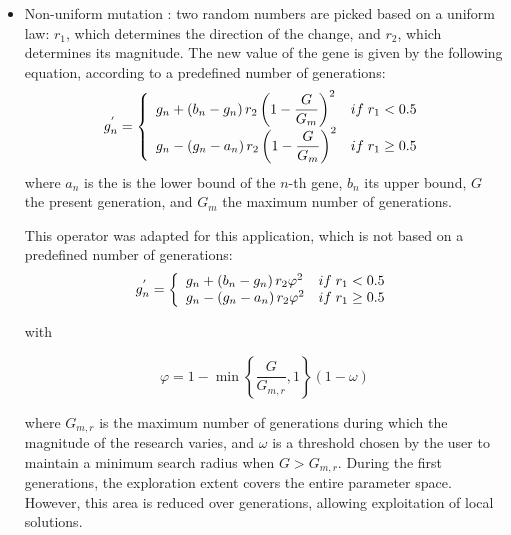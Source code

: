 \documentclass{ametsoc}
\begin{document}
\begin{itemize}
	\item Non-uniform mutation \citep{Michalewicz1996}: two random numbers are picked based on a uniform law: $r_{1}$, which determines the direction of the change, and $r_{2}$, which determines its magnitude. The new value of the gene is given by the following equation, according to a predefined number of generations:
	\begin{equation}
	g_{n}^{'} = 
	\left\lbrace \begin{array}{l l} 
	g_{n} + \left(b_{n}-g_{n}\right) r_{2} \left(1 - \dfrac{G}{G_{m}} \right)^{2} & if \; r_{1} < 0.5 \\
	g_{n} - \left(g_{n}-a_{n}\right) r_{2} \left(1 - \dfrac{G}{G_{m}} \right)^{2} & if \; r_{1} \geq 0.5 \\
	\end{array} \right.
	\label{equation_mutation_nonuniform_original}
	\end{equation}
	where $a_{n}$ is the is the lower bound of the $n$-th gene, $b_{n}$ its upper bound, $G$ the present generation, and $G_{m}$ the maximum number of generations.
	
	This operator was adapted for this application, which is not based on a predefined number of generations:
	\begin{equation}
	g_{n}^{'} = 
	\left\lbrace \begin{array}{l l} 
	g_{n} + \left(b_{n}-g_{n}\right) r_{2} \varphi^{2} & if \; r_{1} < 0.5 \\
	g_{n} - \left(g_{n}-a_{n}\right) r_{2} \varphi^{2} & if \; r_{1} \geq 0.5 \\
	\end{array} \right.
	\label{equation_mutation_nonuniform}
	\end{equation}
	
	with 
	
	\begin{equation}
	\varphi = 1 - \min \left\lbrace \dfrac{G}{G_{m,r}}, 1 \right\rbrace \left(1-\omega\right)
	\end{equation}
	
	where $G_{m,r}$ is the maximum number of generations during which the magnitude of the research varies, and $\omega$ is a threshold chosen by the user to maintain a minimum search radius when $G>G_{m,r}$. During the first generations, the exploration extent covers the entire parameter space. However, this area is reduced over generations, allowing exploitation of local solutions.
	

\end{itemize}
\end{document}
